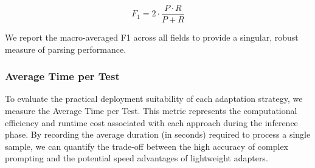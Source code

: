 \documentclass[journal,article,submit,pdftex,moreauthors]{Definitions/mdpi}
\begin{document}
\begin{equation}
    F_1 = 2 \cdot \frac{P \cdot R}{P + R}
\end{equation}

We report the macro-averaged F1 across all fields to provide a singular, robust measure of parsing performance.

\subsubsection{Average Time per Test}

To evaluate the practical deployment suitability of each adaptation strategy, we measure the Average Time per Test. This metric represents the computational efficiency and runtime cost associated with each approach during the inference phase. By recording the average duration (in seconds) required to process a single sample, we can quantify the trade-off between the high accuracy of complex prompting and the potential speed advantages of lightweight adapters.
\end{document}
